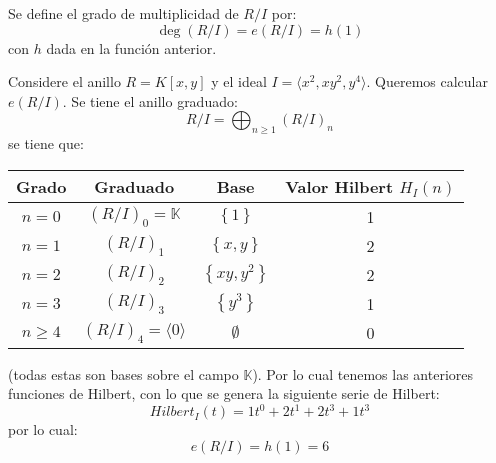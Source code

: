 \documentclass[12pt]{report}
\theoremstyle{largebreak}
\begin{document}
    \begin{mydef}
        Se define el grado de multiplicidad de $R/I$ por:
        \begin{equation*}
            \deg(R/I)=e(R/I)=h(1)
        \end{equation*}
        con $h$ dada en la función anterior.
    \end{mydef}

    \begin{exa}
        Considere el anillo $R=K[x,y]$ y el ideal $I=\langle x^2,xy^2,y^4\rangle$. Queremos calcular $e(R/I)$. Se tiene el anillo graduado:
        \begin{equation*}
            R/I=\bigoplus_{ n\geq 1}(R/I)_n
        \end{equation*}
        se tiene que:
        \begin{center}
            \begin{tabular}{c | c | c | c}
                Grado & Graduado & Base & Valor Hilbert $H_I(n)$ \\
                \hline
                $n=0$ & $(R/I)_0=\mathbb{K}$ & $\left\{1 \right\}$ & 1 \\
                $n=1$ & $(R/I)_1$ & $\left\{x,y \right\}$ & 2 \\
                $n=2$ & $(R/I)_2$ & $\left\{xy,y^2 \right\}$ & 2 \\
                $n=3$ & $(R/I)_3$ & $\left\{y^3 \right\}$ & 1 \\
                $n\geq4$ & $(R/I)_4=\langle 0\rangle$ & $\emptyset$ & 0 \\
            \end{tabular}
        \end{center}
        (todas estas son bases sobre el campo $\mathbb{K}$).
        Por lo cual tenemos las anteriores funciones de Hilbert, con lo que se genera la siguiente serie de Hilbert:
        \begin{equation*}
            Hilbert_I(t)=1t^0+2t^1+2t^3+1t^3
        \end{equation*}
        por lo cual:
        \begin{equation*}
            e(R/I)=h(1)=6
        \end{equation*}
    \end{exa}
\end{document}

